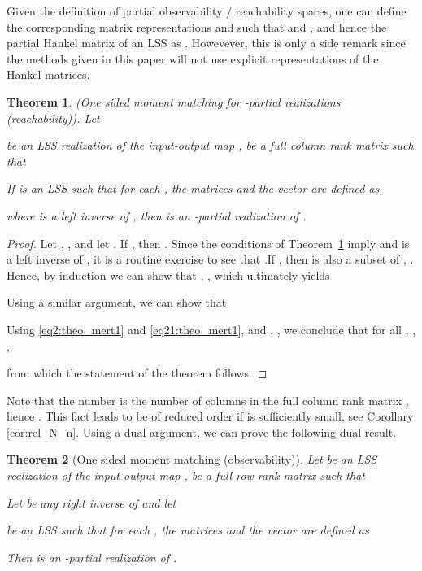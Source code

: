 \documentclass[journal]{IEEEtran}
\newtheorem{Theorem}{Theorem}
\begin{document}
Given the definition of partial observability / reachability spaces, one can define the corresponding matrix representations  and  such that  and , and hence the partial Hankel matrix  of an LSS  as . Howevever, this is only a side remark since the methods given in this paper will not use explicit representations of the Hankel matrices.

\begin{Theorem} \label{theo:mert1}
	\emph{(One sided moment matching for -partial realizations (reachability)).}
	Let
	
	be an LSS realization of the input-output map ,  be a full column rank matrix such that
	
	If  is an LSS such that for each , the matrices  and the vector  are defined as
	
	where  is a left inverse of , 
	then  is an -partial realization of .
\end{Theorem}

\begin{proof}
	Let , ,  and let . If , then . Since the conditions of Theorem~\ref{theo:mert1} imply  and  is a left inverse of , it is a routine exercise to see that .If , then  is also a subset of , . Hence, by induction we can show that 
	, , which ultimately yields
	
	Using a similar argument, we can show that
	
	Using \eqref{eq2:theo_mert1} and \eqref{eq21:theo_mert1}, and 
	, , we conclude that for all , ,
	, 
	
	from which the statement of the theorem follows.
\end{proof}

Note that the number  is the number of columns in the full column rank matrix , hence . This fact leads  to be of reduced order if  is sufficiently small, see Corollary \ref{cor:rel_N_n}. Using a dual argument, we can prove the following dual result.

\begin{Theorem}[One sided moment matching (observability)] \label{theo:mert2}
	Let  be an LSS realization of the input-output map ,  be a full row rank matrix such that
	
	Let  be any right inverse of  and let
	
	be an LSS such that for each , the matrices  and the vector  are defined as
	
	Then  is an -partial realization of .
\end{Theorem}
\end{document}
